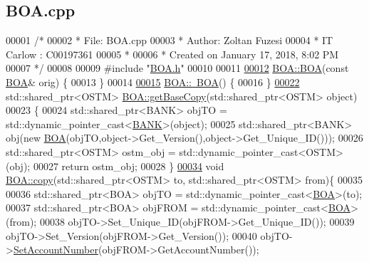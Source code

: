 \hypertarget{_b_o_a_8cpp_source}{}\subsection{B\+O\+A.\+cpp}

\begin{DoxyCode}
00001 \textcolor{comment}{/* }
00002 \textcolor{comment}{ * File:   BOA.cpp}
00003 \textcolor{comment}{ * Author: Zoltan Fuzesi}
00004 \textcolor{comment}{ * IT Carlow : C00197361}
00005 \textcolor{comment}{ *}
00006 \textcolor{comment}{ * Created on January 17, 2018, 8:02 PM}
00007 \textcolor{comment}{ */}
00008 
00009 \textcolor{preprocessor}{#include "\hyperlink{_b_o_a_8h}{BOA.h}"}
00010 
00011 
\hypertarget{_b_o_a_8cpp_source.tex_l00012}{}\hyperlink{class_b_o_a_a99ebf22a8d824761dc82e7e191e6f173}{00012} \hyperlink{class_b_o_a_ad42dc670d422172c9bcf9b3d354c8a3c}{BOA::BOA}(\textcolor{keyword}{const} \hyperlink{class_b_o_a}{BOA}& orig) \{
00013 \}
00014 
\hypertarget{_b_o_a_8cpp_source.tex_l00015}{}\hyperlink{class_b_o_a_abe27b17a23ceffc6269dbe6d81de5212}{00015} \hyperlink{class_b_o_a_abe27b17a23ceffc6269dbe6d81de5212}{BOA::~BOA}() \{
00016 \}
\hypertarget{_b_o_a_8cpp_source.tex_l00022}{}\hyperlink{class_b_o_a_a46ace5d3c945a423e93912673cadfad5}{00022} std::shared\_ptr<OSTM> \hyperlink{class_b_o_a_a46ace5d3c945a423e93912673cadfad5}{BOA::getBaseCopy}(std::shared\_ptr<OSTM> \textcolor{keywordtype}{object})
00023 \{
00024         std::shared\_ptr<BANK> objTO = std::dynamic\_pointer\_cast<\hyperlink{class_b_a_n_k}{BANK}>(object);
00025     std::shared\_ptr<BANK> obj(\textcolor{keyword}{new} \hyperlink{class_b_o_a_ad42dc670d422172c9bcf9b3d354c8a3c}{BOA}(objTO,object->Get\_Version(),\textcolor{keywordtype}{object}->Get\_Unique\_ID())); 
00026         std::shared\_ptr<OSTM> ostm\_obj = std::dynamic\_pointer\_cast<OSTM>(obj);
00027     \textcolor{keywordflow}{return} ostm\_obj;
00028 \}
\hypertarget{_b_o_a_8cpp_source.tex_l00034}{}\hyperlink{class_b_o_a_a54fbcabb55b22fb72f45986768974403}{00034} \textcolor{keywordtype}{void} \hyperlink{class_b_o_a_a54fbcabb55b22fb72f45986768974403}{BOA::copy}(std::shared\_ptr<OSTM> to, std::shared\_ptr<OSTM> from)\{
00035 
00036     std::shared\_ptr<BOA> objTO = std::dynamic\_pointer\_cast<\hyperlink{class_b_o_a}{BOA}>(to);
00037     std::shared\_ptr<BOA> objFROM = std::dynamic\_pointer\_cast<\hyperlink{class_b_o_a}{BOA}>(from);
00038     objTO->Set\_Unique\_ID(objFROM->Get\_Unique\_ID());
00039     objTO->Set\_Version(objFROM->Get\_Version());
00040     objTO->\hyperlink{class_b_o_a_a6b85963680344bd719ab862a50a09588}{SetAccountNumber}(objFROM->GetAccountNumber());

\end{DoxyCode}
